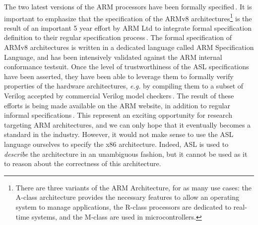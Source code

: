 The two latest versions of the ARM processors have been formally
specified\,\cite{fox2010armv7,reid2016armv8}.
%
It is important to emphasize that the specification of the ARMv8
architectures\footnote{There are three variants of the ARM Architecture, for as
  many use cases: the A-class architecture provides the necessary features to
  allow an operating system to manage applications, the R-class processors are
  dedicated to real-time systems, and the M-class are used in microcontrollers.}
is the result of an important 5 year effort by ARM Ltd to integrate formal
specification definition to their regular specification
process\,\cite{reid2016armv8}.
%
The formal specification of ARMv8 architectures is written in a dedicated
language called ARM Specification Language, and has been intensively validated
against the ARM internal conformance testsuit.
%
Once the level of trustworthiness of the ASL specifications have been asserted,
they have been able to leverage them to formally verify properties of the
hardware architectures, \emph{e.g.} by compiling them to a subset of Verilog
accepted by commercial Verilog model checkers\,\cite{reid2016end}.
%
The result of these efforts is being made available on the ARM website, in
addition to regular informal specifications\,\cite{arm2018aspec}.
%
This represent an exciting opportunity for research targeting ARM architectures,
and we can only hope that it eventually becomes a standard in the industry.
%
However, it would not make sense to use the ASL language ourselves to specify
the x86 architecture. 
%
Indeed, ASL is used to \emph{describe} the architecture in an unambiguous
fashion, but it cannot be used as it to reason about the correctness of this
architecture. 

